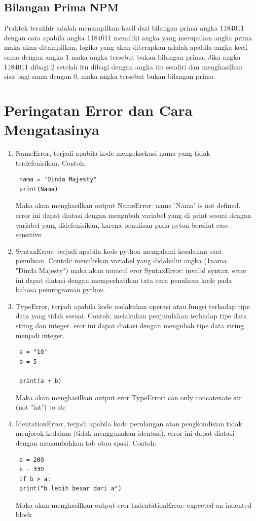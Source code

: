 \subsection{Bilangan Prima NPM}
Praktek terakhir adalah menampilkan hasil dari bilangan prima angka 1184011 dengan cara apabila angka 1184011 memiliki angka yang merupakan angka prima maka akan ditampilkan, logika yang akan diterapkan adalah apabila angka kecil sama dengan angka 1 maka angka tersebut bukan bilangan prima. Jika angka 1184011 dibagi 2 setelah itu dibagi dengan angka itu sendiri dan menghasilkan sisa bagi sama dengan 0, maka angka tersebut bukan bilangan prima


\section{Peringatan Error dan Cara Mengatasinya}
\begin{enumerate}
 \item NameError, terjadi apabila kode mengeksekusi nama yang tidak terdefenisikan. Contoh:
 \begin{verbatim}
 nama = "Dinda Majesty"
 print(Nama)
 \end{verbatim}
 Maka akan menghasilkan output NameError: name 'Nama' is not defined. error ini dapat diatasi dengan mengubah variabel yang di print sesuai dengan variabel yang didefenisikan, karena penulisan pada pyton bersifat case-sensitive
 
 \item SyntaxError, terjadi apabila kode python mengalami kesalahan saat penulisan. Contoh: menuliskan variabel yang didahului angka (1nama = "Dinda Majesty") maka akan muncul eror SyntaxError: invalid syntax. error ini dapat diatasi dengan memperhatikan tata cara penulisan kode pada bahasa pemrograman python.
 
 \item TypeError, terjadi apabila kode melakukan operasi atau fungsi terhadap tipe data yang tidak sesuai. Contoh: melakukan penjumlahan terhadap tipe data string dan integer. eror ini dapat diatasi dengan mengubah tipe data string menjadi integer.
 \begin{verbatim}
 a = "10"
 b = 5

 print(a + b)
 \end{verbatim}
 Maka akan menghasilkan output eror TypeError: can only concatenate str (not "int") to str
 
 \item IdentationError, terjadi apabila kode perulangan atau pengkondisian tidak menjorok kedalam (tidak menggunakan identasi), error ini dapat diatasi dengan menambahkan tab atau spasi. Contoh:
 \begin{verbatim}
 a = 200
 b = 330
 if b > a:
 print("b lebih besar dari a")
 \end{verbatim}
 Maka akan menghasilkan output eror IndentationError: expected an indented block
\end{enumerate}

